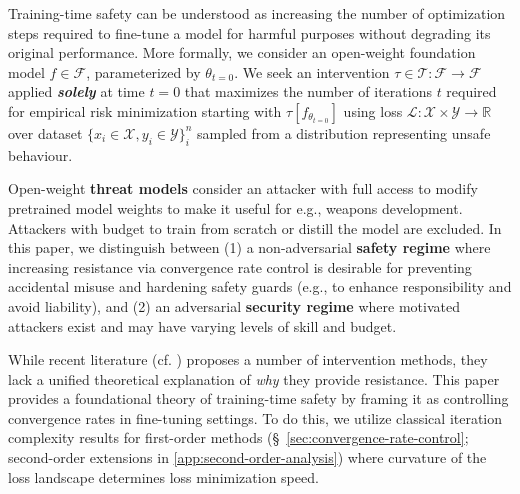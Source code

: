 \documentclass{article}
\theoremstyle{plain}
\theoremstyle{definition}
\theoremstyle{remark}
\begin{document}
Training-time safety can be understood as increasing the number of optimization steps required to fine-tune a model for harmful purposes without degrading its original performance. More formally, we consider an open-weight foundation model $f \in \mathcal{F}$, parameterized by $\theta_{t=0}$. We seek an intervention $\tau \in \mathcal{T}: \mathcal{F} \to \mathcal{F}$ applied \textbf{\textit{solely}} at time $t = 0$ that maximizes the number of iterations $t$ required for empirical risk minimization starting with $\tau[f_{\theta_{t=0}}]$ using loss $\mathcal{L}: \mathcal{X} \times \mathcal{Y} \to \mathbb{R}$ over dataset $\{x_i \in \mathcal{X}, y_i \in \mathcal{Y}\}_i^n$ sampled from a distribution representing unsafe behaviour. 

Open-weight \textbf{threat models} \citep{wallace2025estimating, casper2025open} consider an attacker with full access to modify pretrained model weights to make it useful for  e.g., weapons development. Attackers with budget to train from scratch or distill the model are excluded. In this paper, we distinguish between (1) a non-adversarial \textbf{safety regime} where increasing resistance via convergence rate control is desirable for preventing accidental misuse and hardening safety guards (e.g., to enhance responsibility and avoid liability), and (2) an adversarial \textbf{security regime} where motivated attackers exist and may have varying levels of skill and budget.

While recent literature (cf. \citealp{huang2024harmful,che2025model}) proposes a number of intervention methods, they lack a unified theoretical explanation of \textit{why} they provide resistance. This paper provides a foundational theory of training-time safety by framing it as controlling convergence rates in fine-tuning settings. To do this, we utilize classical iteration complexity results for first-order methods (\S~\ref{sec:convergence-rate-control}; second-order extensions in \cref{app:second-order-analysis}) where curvature of the loss landscape determines loss minimization speed. 
\end{document}
